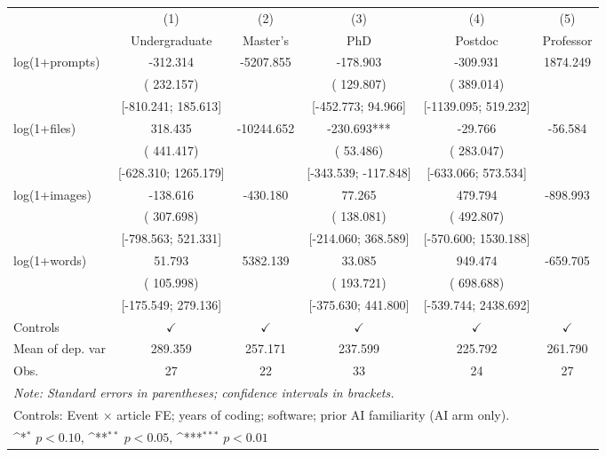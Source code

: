 \def\sym#1{\ifmmode^{#1}\else\(^{#1}\)\fi}
\begin{tabular}{l*{5}{c}}
\hline\hline
 & (1) & (2) & (3) & (4) & (5)
\\
 & Undergraduate & Master's & PhD & Postdoc & Professor
 \\
\hline
log(1+prompts) & -312.314 & -5207.855 & -178.903 & -309.931 &  1874.249
\\
 & ( 232.157) &  & ( 129.807) & ( 389.014) & 
\\
 & [-810.241;  185.613] &  & [-452.773;  94.966] & [-1139.095;  519.232] & 
\\
log(1+files) &  318.435 & -10244.652 & -230.693*** & -29.766 & -56.584
\\
 & ( 441.417) &  & ( 53.486) & ( 283.047) & 
\\
 & [-628.310;  1265.179] &  & [-343.539; -117.848] & [-633.066;  573.534] & 
\\
log(1+images) & -138.616 & -430.180 &  77.265 &  479.794 & -898.993
\\
 & ( 307.698) &  & ( 138.081) & ( 492.807) & 
\\
 & [-798.563;  521.331] &  & [-214.060;  368.589] & [-570.600;  1530.188] & 
\\
log(1+words) &  51.793 &  5382.139 &  33.085 &  949.474 & -659.705
\\
 & ( 105.998) &  & ( 193.721) & ( 698.688) & 
\\
 & [-175.549;  279.136] &  & [-375.630;  441.800] & [-539.744;  2438.692] & 
\\
\hline
Controls & $\checkmark$ & $\checkmark$ & $\checkmark$ & $\checkmark$ & $\checkmark$
\\
Mean of dep. var &  289.359 &  257.171 &  237.599 &  225.792 &  261.790
\\
Obs. & 27 & 22 & 33 & 24 & 27
\\
\hline
\hline\hline
\multicolumn{6}{l}{\it{Note:} Standard errors in parentheses; confidence intervals in brackets.}\\
\multicolumn{6}{l}{Controls: Event $\times$ article FE; years of coding; software; prior AI familiarity (AI arm only).}\\
\multicolumn{6}{l}{\sym{*} $p<0.10$, \sym{**} $p<0.05$,  \sym{***} $p<0.01$}\\
\end{tabular}

